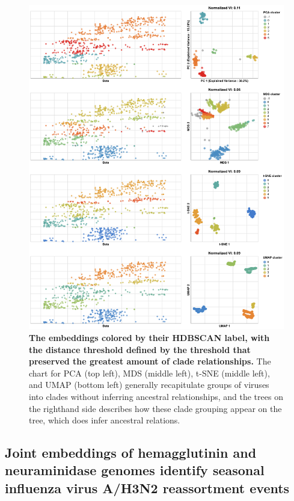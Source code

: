 \documentclass[10pt,letterpaper]{article}
\begin{document}
\begin{figure}[!h]
\includegraphics[width=\columnwidth]{figures/flu-2018-2020-ha-embeddings-by-cluster.png}
\caption{{\bf The embeddings colored by their HDBSCAN label, with the distance threshold defined by the threshold that preserved the greatest amount of clade relationships.}
The chart for PCA (top left), MDS (middle left), t-SNE (middle left), and UMAP (bottom left) generally recapitulate groups of viruses into clades without inferring ancestral relationships, and the trees on the righthand side describes how these clade grouping appear on the tree, which does infer ancestral relations.}
\label{fig:seasonal-influenza-h3n2-ha-2018-2020-clusters}
\end{figure}

\subsection*{Joint embeddings of hemagglutinin and neuraminidase genomes identify seasonal influenza virus A/H3N2 reassortment events}
\end{document}

